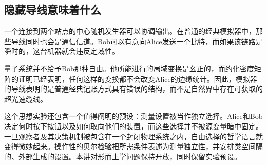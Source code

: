 \begin{classroomqa}
\end{classroomqa}

\subsection{隐藏导线意味着什么}

一个连接到两个站点的中心随机发生器可以协调输出。在普通的经典模拟器中，那些导线同时也会是通信信道。Bob可以有意向Alice发送一个比特，而如果该链路是瞬时的，这台机器就会违反定域性。

量子系统并不给予Bob那种自由。他所能进行的局域变换是幺正的，而约化密度矩阵的证明已经表明，任何这样的变换都不会改变Alice的边缘统计。因此，模拟器的导线表明的是普通经典记账方式具有错误的结构，而不是自然界中存在可获取的超光速缆线。

\begin{classroomqa}
\end{classroomqa}

\begin{classroomqa}
\end{classroomqa}

这个思想实验还包含一个值得阐明的预设：测量设置被当作独立选择。Alice和Bob决定何时按下按钮以及如何取向他们的装置，而这些选择并不被源变量暗中固定。一旦观察者及其决策机制被包含在一个封闭物理系统之内，自由选择的哲学语言就变得微妙起来。操作性的贝尔检验把所需条件表述为测量独立性，并安排类空间隔的、外部生成的设置。本讲对形而上学问题保持开放，同时保留实验预设。

\begin{classroomqa}
\end{classroomqa}


